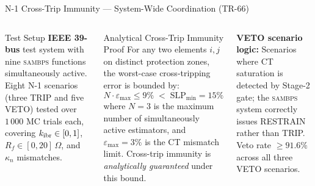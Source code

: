 \documentclass[aspectratio=169, 10pt]{beamer}
\newcommand{\SAMBPS}{\textsc{sambps}}
\newcommand{\kn}{\kappa_n}
\begin{document}

\begin{frame}{N-1 Cross-Trip Immunity — System-Wide Coordination (TR-66)}
\begin{columns}[t]
\begin{block}{Test Setup}
\footnotesize
\textbf{IEEE 39-bus} test system with nine \SAMBPS{} functions
simultaneously active. Eight N-1 scenarios (three TRIP and five VETO)
tested over $1\,000$ MC trials each, covering
$k_{\rm ibr} \in [0,1]$, $R_f \in [0,20]\,\Omega$,
and $\kn$ mismatches.
\end{block}
\vspace{5pt}
\begin{block}{Analytical Cross-Trip Immunity Proof}
\footnotesize
For any two elements $i,j$ on distinct protection zones,
the worst-case cross-tripping error is bounded by:
\[
  N \cdot \varepsilon_{\max} \leq 9\% \;<\; \mathrm{SLP}_{\min} = 15\%
\]
where $N=3$ is the maximum number of simultaneously active
estimators, and $\varepsilon_{\max} = 3\%$ is the CT mismatch limit.
Cross-trip immunity is \emph{analytically guaranteed} under this bound.
\end{block}
\vspace{5pt}
\begin{tcolorbox}[keybox]
\footnotesize
\textbf{VETO scenario logic:} Scenarios where CT saturation is
detected by Stage-2 gate; the \SAMBPS{} system correctly issues
RESTRAIN rather than TRIP.  Veto rate $\geq 91.6\%$ across
all three VETO scenarios.
\end{tcolorbox}


\end{columns}
\end{frame}
\end{document}
